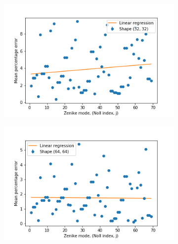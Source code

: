 \begin{figure}[h]
	\centering
	\begin{subfigure}{0.48\textwidth}
		\centering
		\includegraphics[width=\linewidth]{images/Zernike_fitting_percentage_error_one_mode_32_shape.png}
		\caption{}
		\label{fig:Zernike_fitting_percentage_error_one_mode_32_shape}
	\end{subfigure}
	\begin{subfigure}{0.48\textwidth}
		\centering
		\includegraphics[width=\linewidth]{images/Zernike_fitting_percentage_error_one_mode_64_shape.png}
		\caption{}
		\label{fig:Zernike_fitting_percentage_error_one_mode_64_shape}
	\end{subfigure}
	

\end{figure}
